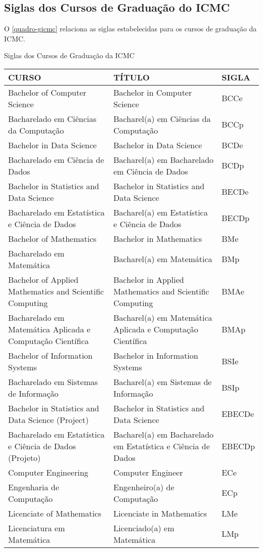 \begin{apendicesenv}
\chapter{Siglas dos Cursos de Graduação do ICMC}
O \autoref{quadro-gicmc} relaciona as siglas estabelecidas para os cursos de graduação da ICMC.
\begin{quadro}[htb]
	\ABNTEXfontereduzida
	\caption[Siglas dos Cursos de Graduação da ICMC]{Siglas dos Cursos de Graduação da ICMC}
	\label{quadro-gicmc}
	\begin{tabular}{|p{6.5cm}|p{6.5cm}|p{1.75cm}|}
		\hline
		\textbf{CURSO} & \textbf{TÍTULO} &  \textbf{SIGLA}  \\
		\hline
		Bachelor of Computer Science & Bachelor in Computer Science & BCCe\\
		Bacharelado em Ci\^encias da Computação & Bacharel(a) em Ci\^encias da Computação & BCCp\\
		Bachelor in Data Science & Bachelor in Data Science & BCDe\\
		Bacharelado em Ci\^encia de Dados & Bacharel(a) em Bacharelado em Ci\^encia de Dados & BCDp\\
		Bachelor in Statistics and Data Science & Bachelor in Statistics and Data Science & BECDe\\
		Bacharelado em Estatística e Ci\^encia de Dados & Bacharel(a) em Estatística e Ci\^encia de Dados & BECDp\\
		Bachelor of Mathematics & Bachelor in Mathematics & BMe\\
		Bacharelado em Matem\'atica & Bacharel(a) em Matem\'atica & BMp\\
		Bachelor of Applied Mathematics and Scientific Computing & Bachelor in Applied Mathematics and Scientific Computing & BMAe\\
		Bacharelado em Matem\'atica Aplicada e Computação Científica & Bacharel(a) em Matem\'atica Aplicada e Computação Científica & BMAp\\
		Bachelor of Information Systems & Bachelor in Information Systems & BSIe\\
		Bacharelado em Sistemas de Informação & Bacharel(a) em Sistemas de Informação & BSIp\\
		Bachelor in Statistics and Data Science (Project) & Bachelor in Statistics and Data Science & EBECDe\\
		Bacharelado em Estatística e Ci\^encia de Dados (Projeto) & Bacharel(a) em Bacharelado em Estatística e Ci\^encia de Dados & EBECDp\\
		Computer Engineering & Computer Engineer & ECe\\
		Engenharia de Computação & Engenheiro(a) de Computação & ECp\\
		Licenciate of  Mathematics & Licenciate in Mathematics & LMe\\
		Licenciatura em Matem\'atica & Licenciado(a) em Matem\'atica & LMp\\
	    \hline
		

\end{tabular}
\end{quadro}
\end{apendicesenv}

